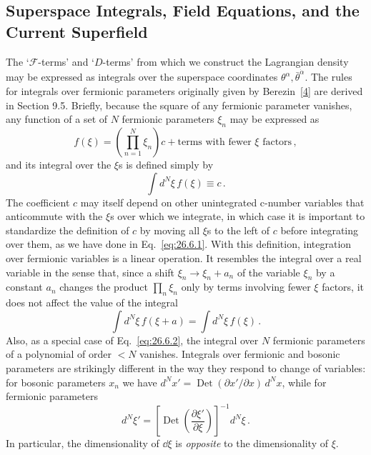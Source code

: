 
\subsection{Superspace Integrals, Field Equations, and the Current Superfield}

The `\(\mathcal{F}\)-terms' and `\(D\)-terms' from which we construct the
Lagrangian density may be expressed as integrals over the superspace
coordinates \(\theta^\alpha,\bar\theta^{\dot\alpha}\). The rules for integrals over fermionic
parameters originally given by Berezin~\hyperref[ch26-ref-4]{[4]} are derived
in Section 9.5. Briefly, because the square of any fermionic parameter
vanishes, any function of a set of \(N\) fermionic parameters \(\xi_n\) may
be expressed as
\begin{equation}
  f(\xi)
  =\left(\prod_{n=1}^{N}\xi_n\right)c
   +\text{terms with fewer \(\xi\) factors}\,,
  \tag{26.6.1}\label{eq:26.6.1}
\end{equation}
and its integral over the \(\xi\)s is defined simply by
\begin{equation}
  \int d^N\xi\,f(\xi)\equiv c\,.
  \tag{26.6.2}\label{eq:26.6.2}
\end{equation}
The coefficient \(c\) may itself depend on other unintegrated c-number
variables that anticommute with the \(\xi\)s over which we integrate, in which
case it is important to standardize the definition of \(c\) by moving all
\(\xi\)s to the left of \(c\) before integrating over them, as we have done
in Eq.~\eqref{eq:26.6.1}. With this definition, integration over fermionic
variables is a linear operation. It resembles the integral over a real
variable in the sense that, since a shift \(\xi_n\longrightarrow\xi_n+a_n\)
of the variable \(\xi_n\) by a constant \(a_n\) changes the product
\(\prod_n\xi_n\) only by terms involving fewer \(\xi\) factors, it does not
affect the value of the integral
\begin{equation}
  \int d^N\xi\,f(\xi+a)=\int d^N\xi\,f(\xi)\,.
  \tag{26.6.3}\label{eq:26.6.3}
\end{equation}
Also, as a special case of Eq.~\eqref{eq:26.6.2}, the integral over \(N\)
fermionic parameters of a polynomial of order \(<N\) vanishes. Integrals over
fermionic and bosonic parameters are strikingly different in the way they
respond to change of variables: for bosonic parameters \(x_n\) we have
\(d^Nx'=\operatorname{Det}(\partial x'/\partial x)\,d^Nx\), while for
fermionic parameters
\begin{equation}
  d^N\xi'
  =\left[\operatorname{Det}
    \left(\frac{\partial\xi'}{\partial\xi}\right)\right]^{-1}d^N\xi\,.
  \tag{26.6.4}\label{eq:26.6.4}
\end{equation}
In particular, the dimensionality of \(\dd\xi\) is \emph{opposite} to the
dimensionality of \(\xi\).

